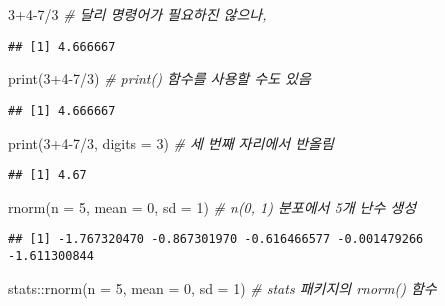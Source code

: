 \documentclass[
  12,
]{article}
\newenvironment{Shaded}{\begin{snugshade}}{\end{snugshade}}
\newcommand{\AttributeTok}[1]{\textcolor[rgb]{0.77,0.63,0.00}{#1}}
\newcommand{\CommentTok}[1]{\textcolor[rgb]{0.56,0.35,0.01}{\textit{#1}}}
\newcommand{\DecValTok}[1]{\textcolor[rgb]{0.00,0.00,0.81}{#1}}
\newcommand{\FunctionTok}[1]{\textcolor[rgb]{0.00,0.00,0.00}{#1}}
\newcommand{\NormalTok}[1]{#1}
\newcommand{\SpecialCharTok}[1]{\textcolor[rgb]{0.00,0.00,0.00}{#1}}
\begin{document}
\begin{Shaded}
\begin{Highlighting}[]
\DecValTok{3}\SpecialCharTok{+}\DecValTok{4{-}7}\SpecialCharTok{/}\DecValTok{3} \CommentTok{\# 달리 명령어가 필요하진 않으나,}
\end{Highlighting}
\end{Shaded}

\begin{verbatim}
## [1] 4.666667
\end{verbatim}

\begin{Shaded}
\begin{Highlighting}[]
\FunctionTok{print}\NormalTok{(}\DecValTok{3}\SpecialCharTok{+}\DecValTok{4{-}7}\SpecialCharTok{/}\DecValTok{3}\NormalTok{) }\CommentTok{\# print() 함수를 사용할 수도 있음}
\end{Highlighting}
\end{Shaded}

\begin{verbatim}
## [1] 4.666667
\end{verbatim}

\begin{Shaded}
\begin{Highlighting}[]
\FunctionTok{print}\NormalTok{(}\DecValTok{3}\SpecialCharTok{+}\DecValTok{4{-}7}\SpecialCharTok{/}\DecValTok{3}\NormalTok{, }\AttributeTok{digits =} \DecValTok{3}\NormalTok{) }\CommentTok{\# 세 번째 자리에서 반올림}
\end{Highlighting}
\end{Shaded}

\begin{verbatim}
## [1] 4.67
\end{verbatim}

\begin{Shaded}
\begin{Highlighting}[]
\FunctionTok{rnorm}\NormalTok{(}\AttributeTok{n =} \DecValTok{5}\NormalTok{, }\AttributeTok{mean =} \DecValTok{0}\NormalTok{, }\AttributeTok{sd =} \DecValTok{1}\NormalTok{) }\CommentTok{\# n(0, 1) 분포에서 5개 난수 생성}
\end{Highlighting}
\end{Shaded}

\begin{verbatim}
## [1] -1.767320470 -0.867301970 -0.616466577 -0.001479266 -1.611300844
\end{verbatim}

\begin{Shaded}
\begin{Highlighting}[]
\NormalTok{stats}\SpecialCharTok{::}\FunctionTok{rnorm}\NormalTok{(}\AttributeTok{n =} \DecValTok{5}\NormalTok{, }\AttributeTok{mean =} \DecValTok{0}\NormalTok{, }\AttributeTok{sd =} \DecValTok{1}\NormalTok{) }\CommentTok{\# stats 패키지의 rnorm() 함수}
\end{Highlighting}
\end{Shaded}
\end{document}
